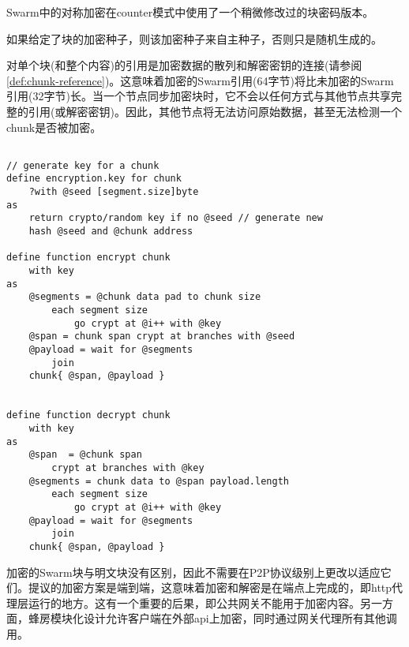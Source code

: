 
Swarm中的对称加密在counter模式中使用了一个稍微修改过的块密码版本。

如果给定了块的加密种子，则该加密种子来自主种子，否则只是随机生成的。 

对单个块(和整个内容)的引用是加密数据的散列和解密密钥的连接(请参阅\ref{def:chunk-reference})。这意味着加密的Swarm引用(64字节)将比未加密的Swarm引用(32字节)长。当一个节点同步加密块时，它不会以任何方式与其他节点共享完整的引用(或解密密钥)。因此，其他节点将无法访问原始数据，甚至无法检测一个chunk是否被加密。

\begin{definition}\label{def:encrypt}
\begin{lstlisting}[language=buzz1]

// generate key for a chunk
define encryption.key for chunk
    ?with @seed [segment.size]byte
as
    return crypto/random key if no @seed // generate new 
    hash @seed and @chunk address

define function encrypt chunk
    with key 
as   
    @segments = @chunk data pad to chunk size
        each segment size 
            go crypt at @i++ with @key 
    @span = chunk span crypt at branches with @seed 
    @payload = wait for @segments 
        join
    chunk{ @span, @payload } 


define function decrypt chunk
    with key 
as       
    @span  = @chunk span 
        crypt at branches with @key 
    @segments = chunk data to @span payload.length
        each segment size 
            go crypt at @i++ with @key
    @payload = wait for @segments 
        join
    chunk{ @span, @payload } 

\end{lstlisting}
\end{definition} 
       
        
加密的Swarm块与明文块没有区别，因此不需要在P2P协议级别上更改以适应它们。提议的加密方案是端到端，这意味着加密和解密是在端点上完成的，即http代理层运行的地方。这有一个重要的后果，即公共网关不能用于加密内容。另一方面，蜂房模块化设计允许客户端在外部api上加密，同时通过网关代理所有其他调用。

